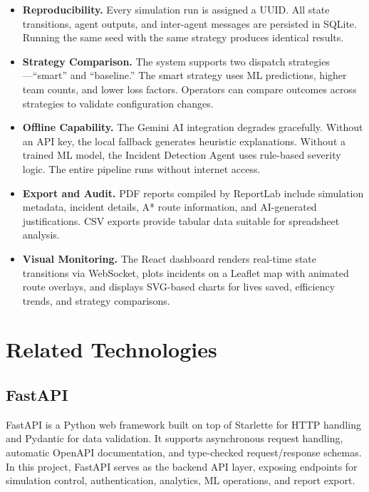 \begin{itemize}[leftmargin=*]
    \item \textbf{Reproducibility.} Every simulation run is assigned a UUID. All state transitions, agent outputs, and inter-agent messages are persisted in SQLite. Running the same seed with the same strategy produces identical results.

    \item \textbf{Strategy Comparison.} The system supports two dispatch strategies---``smart'' and ``baseline.'' The smart strategy uses ML predictions, higher team counts, and lower loss factors. Operators can compare outcomes across strategies to validate configuration changes.

    \item \textbf{Offline Capability.} The Gemini AI integration degrades gracefully. Without an API key, the local fallback generates heuristic explanations. Without a trained ML model, the Incident Detection Agent uses rule-based severity logic. The entire pipeline runs without internet access.

    \item \textbf{Export and Audit.} PDF reports compiled by ReportLab include simulation metadata, incident details, A* route information, and AI-generated justifications. CSV exports provide tabular data suitable for spreadsheet analysis.

    \item \textbf{Visual Monitoring.} The React dashboard renders real-time state transitions via WebSocket, plots incidents on a Leaflet map with animated route overlays, and displays SVG-based charts for lives saved, efficiency trends, and strategy comparisons.
\end{itemize}

\section{Related Technologies}
\label{sec:related_technologies}

\subsection{FastAPI}

FastAPI is a Python web framework built on top of Starlette for HTTP handling and Pydantic for data validation. It supports asynchronous request handling, automatic OpenAPI documentation, and type-checked request/response schemas. In this project, FastAPI serves as the backend API layer, exposing endpoints for simulation control, authentication, analytics, ML operations, and report export.

